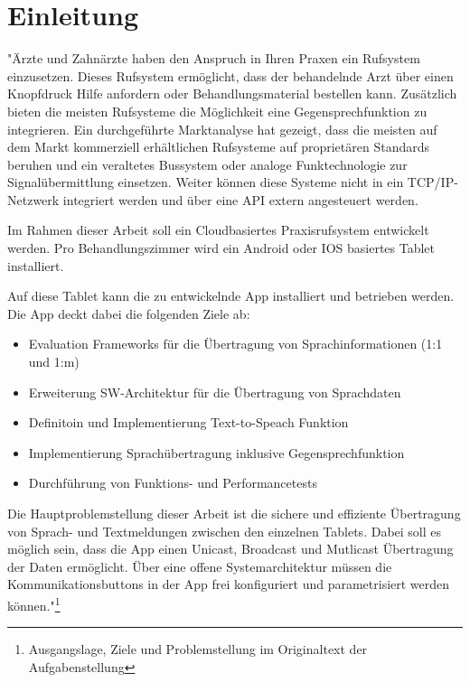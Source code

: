 \section{Einleitung}
"Ärzte und Zahnärzte haben den Anspruch in Ihren Praxen ein Rufsystem einzusetzen.
Dieses Rufsystem ermöglicht, dass der behandelnde Arzt über einen Knopfdruck Hilfe anfordern oder Behandlungsmaterial bestellen kann.
Zusätzlich bieten die meisten Rufsysteme die Möglichkeit eine Gegensprechfunktion zu integrieren.
Ein durchgeführte Marktanalyse hat gezeigt, dass die meisten auf dem Markt kommerziell erhältlichen Rufsysteme auf proprietären Standards beruhen und ein veraltetes Bussystem oder analoge Funktechnologie zur Signalübermittlung einsetzen.
Weiter können diese Systeme nicht in ein TCP/IP-Netzwerk integriert werden und über eine API extern angesteuert werden.

Im Rahmen dieser Arbeit soll ein Cloudbasiertes Praxisrufsystem entwickelt werden.
Pro Behandlungszimmer wird ein Android oder IOS basiertes Tablet installiert.

Auf diese Tablet kann die zu entwickelnde App installiert und betrieben werden.
Die App deckt dabei die folgenden Ziele ab:

\begin{itemize}
    \item Evaluation Frameworks für die Übertragung von Sprachinformationen (1:1 und 1:m)
    \item Erweiterung SW-Architektur für die Übertragung von Sprachdaten
    \item Definitoin und Implementierung Text-to-Speach Funktion
    \item Implementierung Sprachübertragung inklusive Gegensprechfunktion
    \item Durchführung von Funktions- und Performancetests
\end{itemize}

Die Hauptproblemstellung dieser Arbeit ist die sichere und effiziente Übertragung von Sprach- und Textmeldungen zwischen den einzelnen Tablets.
Dabei soll es möglich sein, dass die App einen Unicast, Broadcast und Mutlicast Übertragung der Daten ermöglicht.
Über eine offene Systemarchitektur müssen die Kommunikationsbuttons in der App frei konfiguriert und parametrisiert werden können."\footnote{Ausgangslage, Ziele und Problemstellung im Originaltext der Aufgabenstellung}\cite{aufgabenstellung}


\clearpage
